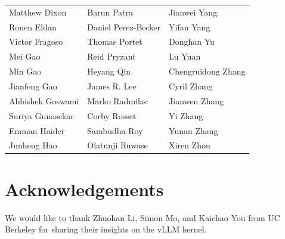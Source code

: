 \documentclass[11pt]{article}
\begin{document}
\begin{tabular}{>{\raggedright\arraybackslash}p{5cm} 
                 >{\raggedright\arraybackslash}p{5cm} 
                 >{\raggedright\arraybackslash}p{5cm}}
Matthew Dixon & Barun Patra & Jianwei Yang \\ 
Ronen Eldan & Daniel Perez-Becker & Yifan Yang \\ 
Victor Fragoso & Thomas Portet & Donghan Yu \\ 
Mei Gao & Reid Pryzant & Lu Yuan \\ 
Min Gao & Heyang Qin & Chengruidong Zhang \\ 
Jianfeng Gao & James R. Lee & Cyril Zhang \\ 
Abhishek Goswami & Marko Radmilac & Jianwen Zhang \\ 
Suriya Gunasekar & Corby Rosset & Yi Zhang \\ 
Emman Haider & Sambudha Roy & Yunan Zhang \\ 
Junheng Hao & Olatunji Ruwase & Xiren Zhou
\end{tabular}

\section{Acknowledgements}
We would like to thank Zhuohan Li, Simon Mo, and Kaichao You from UC Berkeley for sharing their insights on the vLLM kernel.
\end{document}
